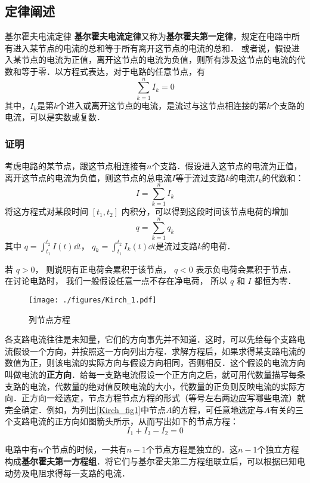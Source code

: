 

\subsection{定律阐述}
\begin{theorem}{基尔霍夫电流定律}
\textbf{基尔霍夫电流定律}又称为\textbf{基尔霍夫第一定律}，规定在电路中所有进入某节点的电流的总和等于所有离开这节点的电流的总和． 或者说，假设进入某节点的电流为正值，离开这节点的电流为负值，则所有涉及这节点的电流的代数和等于零．以方程式表达，对于电路的任意节点，有
\begin{equation}
\sum_{k=1}^n I_k =0
\end{equation}
其中，$I_k$是第$k$个进入或离开这节点的电流，是流过与这节点相连接的第$k$个支路的电流，可以是实数或复数．
\end{theorem}

\subsubsection{证明}
考虑电路的某节点，跟这节点相连接有$n$个支路．假设进入这节点的电流为正值，离开这节点的电流为负值，则这节点的总电流$I$等于流过支路$k$的电流$I_k$的代数和：
\begin{equation}
I=\sum_{k=1}^n I_k
\end{equation}
将这方程式对某段时间 $[t_1, t_2]$ 内积分，可以得到这段时间该节点电荷的增加
\begin{equation}
q=\sum_{k=1}^n q_k
\end{equation}
其中 $q = \int_{t_1}^{t_2} I(t) \dd{t}$， $q_k=\int_{t_1}^{t_2} I_k(t) \dd{t}$是流过支路$k$的电荷．

若 $q>0$， 则说明有正电荷会累积于该节点， $q < 0$ 表示负电荷会累积于节点． 在讨论电路时， 我们一般假设任意一点不存在净电荷， 所以 $q$ 和 $I$ 都恒为零．

\begin{example}{}

\begin{figure}[ht]
\centering
\texttt{[image: ./figures/Kirch\_1.pdf]}
\caption{列节点方程} \label{Kirch_fig1}
\end{figure}
各支路电流往往是未知量，它们的方向事先并不知道．这时，可以先给每个支路电流假设一个方向，并按照这一方向列出方程．求解方程后，如果求得某支路电流的数值为正，则该电流的实际方向与假设方向相同，否则相反．这个假设的电流方向叫做电流的\textbf{正方向}．给每一支路电流假设一个正方向之后，就可用代数量描写每条支路的电流，代数量的绝对值反映电流的大小，代数量的正负则反映电流的实际方向．正方向一经选定，节点方程节点方程的形式（等号左右两边应写哪些电流）就完全确定．例如，为列出\autoref{Kirch_fig1}中节点$A$的方程，可任意地选定与$A $有关的三个支路电流的正方向如图箭头所示，从而写出如下的节点方程：
\begin{equation}
I_1+I_3-I_2=0
\end{equation}
\end{example}
电路中有$n$个节点的时候，一共有$n-1$个节点方程是独立的．这$n-1$个独立方程构成\textbf{基尔霍夫第一方程组}．将它们与基尔霍夫第二方程组联立后，可以根据已知电动势及电阻求得每一支路的电流．

